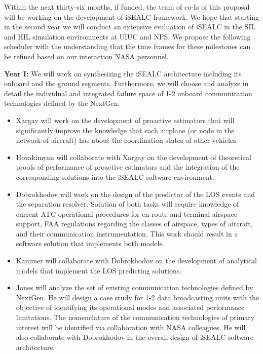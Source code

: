 \documentclass[letter,onecolumn,12pt]{aiaa-tc}
\newcommand{\1}{1_n}
\begin{document}
Within the next thirty-six months, if funded, the team of co-Is of this proposal will be working on the development of iSEALC framework. We hope that starting in the second year we will conduct an extensive evaluation of iSEALC in the SIL and HIL simulation environments at UIUC and NPS. We propose the following scheduler with the understanding that the time frames for these milestones can be refined based on our interaction NASA personnel.

\textbf{Year I:} We will work on synthesizing the iSEALC architecture including its onboard and the ground segments.
Furthermore, we will choose and analyze in detail the individual and integrated failure space of 1-2 onboard communication
technologies defined by the NextGen.
\vspace{-3mm}
\begin{itemize}
\setlength{\itemsep}{-4pt}
    \item Xargay will work on the development of proactive estimators that will significantly improve the knowledge that each airplane (or node in the network of aircraft) has about the coordination states of other vehicles.

    \item Hovakimyan will collaborate with Xargay on the development of theoretical proofs of performance of proactive estimators and the integration of the corresponding solutions into the iSEALC software environment.

    \item Dobrokhodov will work on the design of the predictor of the LOS events and the separation resolver. Solution of both tasks will require knowledge of current ATC operational procedures for en route and terminal airspace support, FAA regulations regarding the classes of airspace, types  of aircraft, and their communication instrumentation. This work should result in a software solution that implements both models.

    \item Kaminer will collaborate with Dobrokhodov on the development of analytical models that implement the LOS predicting solutions.

    \item Jones will analyze the set of existing communication technologies defined by NextGen. He will design a case study for 1-2 data broadcasting units with the objective of identifying its operational modes and associated performance limitations. The nomenclature of the communication technologies of primary interest will be identified via collaboration with NASA colleagues. He will also collaborate with Dobrokhodov in the overall design of iSEALC software architecture.
\end{itemize}
\vspace{-2mm}
\end{document}
